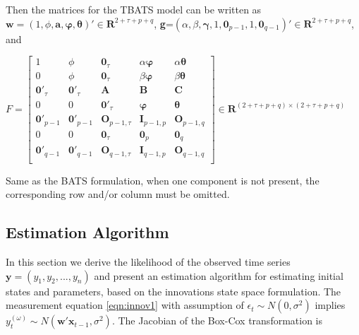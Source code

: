 \documentclass{uwstat572}
\begin{document}
Then the matrices for the TBATS model can be written as $\textbf{w}=(1,\phi,\textbf{a}, \bm{\varphi}, \bm{\theta})' \in \mathbf{R}^{2+\tau+p+q}$, \textbf{g}=$(\alpha,\beta,\bm{\gamma}, 1, \textbf{0}_{p-1}, 1, \textbf{0}_{q-1})'\in \mathbf{R}^{2+\tau+p+q}$, and 

\begin{center}
$F=\begin{bmatrix} 
1 & \phi& \textbf{0}_\tau & \alpha \bm{\varphi} & \alpha \bm{\theta}  \\
0 & \phi& \textbf{0}_\tau & \beta \bm{\varphi} & \beta \bm{\theta}  \\
\textbf{0}'_\tau &  \textbf{0}'_\tau  & \bm{A} & \bm{B} & \bm{C} \\
0 & 0 & \textbf{0}'_\tau & \bm{\varphi} & \bm{\theta}  \\
\bm{0}'_{p-1} & \bm{0}'_{p-1} & \textbf{O}_{p-1,\tau} & \bm{I}_{p-1,p} &\textbf{O}_{p-1,q} \\
0 & 0 &\textbf{0}_\tau & \textbf{0}_p & \textbf{0}_q \\
\bm{0}'_{q-1} & \bm{0}'_{q-1} & \textbf{O}_{q-1,\tau} & \bm{I}_{q-1,p} &\textbf{O}_{q-1,q} \\
\end{bmatrix} \in \mathbf{R}^{(2+\tau+p+q) \times (2+\tau+p+q)}$ 
\end{center}

\noindent Same as the BATS formulation, when one component is not present, the corresponding row and/or column must be omitted.

\subsection{Estimation Algorithm}
In this section we derive the likelihood of the observed time series $\textbf{y}=(y_1,y_2,...,y_n)$ and present an estimation algorithm for estimating initial states and parameters, based on the innovations state space formulation. The measurement equation \ref{eqn:innov1} with assumption of $\epsilon_t \sim N(0,\sigma^2)$ implies $y_t^{(\omega)} \sim N(\textbf{w}'\textbf{x}_{t-1},\sigma^2)$. The Jacobian of the Box-Cox transformation is
\end{document}
